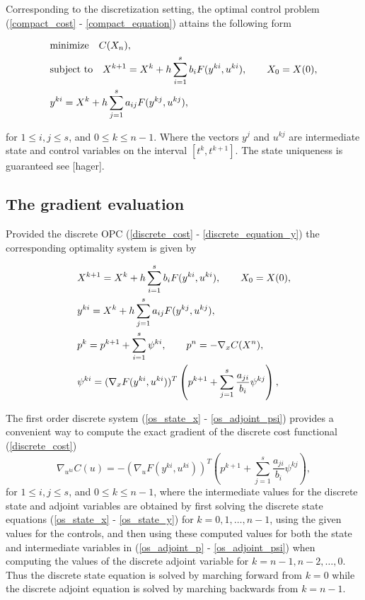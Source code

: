 \documentclass[a4paper,10pt, english]{article}
\newcommand{\D}{\displaystyle}
\begin{document}
 Corresponding to the discretization setting, the optimal control problem (\ref{compact_cost} -  \ref{compact_equation})  attains the following form
 
 \begin{align}
  \D
  & \mbox{minimize}\quad C(X_n), \label{discrete_cost}\\
  & \mbox{subject to} \quad X^{k+1}  = X^k + h\sum_{i=1}^{s}b_iF(y^{ki}, u^{ki}), \qquad X_0 = X(0), \label{discrete_equation_x}\\
  & y^{ki} = X^k + h\sum_{j=1}^{s}a_{ij}F(y^{kj}, u^{kj}),\label{discrete_equation_y}
  \end{align}
 
 for $1\leq i, j\leq s$, and $0\leq k\leq n-1$.
 Where the vectors $y^j$ and $u^{kj}$ are intermediate state and control variables on the interval $[t^k, t^{k+1}]$. The state uniqueness is guaranteed see [hager]. 
 
 
 

\newpage
\subsection{The gradient evaluation}
Provided the discrete OPC (\ref{discrete_cost} - \ref{discrete_equation_y}) the corresponding  optimality system  is given by

  \begin{align}
   \D
    & X^{k+1}  = X^k + h\sum_{i=1}^{s}b_iF(y^{ki}, u^{ki}), \qquad X_0 = X(0),   \label{os_state_x}\\
 	& y^{ki} = X^k + h\sum_{j=1}^{s}a_{ij}F(y^{kj}, u^{kj}),   \label{os_state_y}\\
 	& p^k = p^{k+1} + \sum_{i=1}^{s}\psi^{ki}, \qquad p^n = - \nabla_xC(X^n),  \label{os_adjoint_p}\\
 	& \psi^{ki} = (\nabla_x F(y^{ki}, u^{ki}))^{T} \left( p^{k+1} + \sum_{j=1}^{s} \frac{a_{ji}}{b_i}\psi^{kj}\right), \label{os_adjoint_psi} 
   \end{align}

The first order discrete system (\ref{os_state_x} - \ref{os_adjoint_psi}) provides a convenient way to compute the exact gradient of the discrete cost functional (\ref{discrete_cost})
\begin{equation}
\nabla_{u^{ki}} C(u) = - (\nabla_u F(y^{ki}, u^{ki}))^{T} \left( p^{k+1} + \sum_{j=1}^{s}\frac{a_{ji}}{b_i}\psi^{kj}\right), 
\label{discretegradient}
 \end{equation}  
 for $1\leq i, j\leq s$, and $0\leq k\leq n-1$, where the intermediate values for the discrete state and adjoint variables are obtained by first
 solving the discrete state equations (\ref{os_state_x} - \ref{os_state_y}) for $k=0, 1, \dots, n-1$, using the given values for the controls, and then using these computed values for both the state and intermediate variables in (\ref{os_adjoint_p} - \ref{os_adjoint_psi}) when computing the values of the discrete adjoint variable for $k=n-1, n-2, \dots, 0$. Thus the discrete state equation is solved by marching forward from 
 $ k = 0$ while the discrete adjoint equation is solved by marching backwards from $k = n-1$.
 
\end{document}
